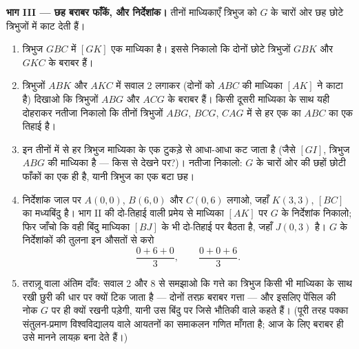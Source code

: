 \begin{problem}[{सप्ताहांत समस्या --- किसी त्रिभुज की माध्यिकाएँ एक
ही बिंदु पर मिलती हैं, हर एक के दो-तिहाई पर}]
\medskip
\noindent\textbf{भाग III --- छह बराबर फाँकें, और निर्देशांक।}
तीनों माध्यिकाएँ त्रिभुज को $G$ के चारों ओर छह छोटे त्रिभुजों में
काट देती हैं।
\begin{enumerate}[resume]
  \item त्रिभुज $GBC$ में  $[GK]$ एक माध्यिका है। इससे
        निकालो कि दोनों छोटे त्रिभुजों $GBK$ और $GKC$ के 
        बराबर हैं।
  \item त्रिभुजों $ABK$ और $AKC$ में सवाल 2 लगाकर (दोनों को $ABC$
        की माध्यिका $[AK]$ ने काटा है) दिखाओ कि त्रिभुजों $ABG$
        और $ACG$ के  बराबर हैं। किसी दूसरी माध्यिका के
        साथ यही दोहराकर नतीजा निकालो कि तीनों त्रिभुजों $ABG$,
        $BCG$, $CAG$ में से हर एक का  $ABC$ का एक तिहाई
        है।
  \item इन तीनों में से हर त्रिभुज माध्यिका के एक टुकड़े से आधा-आधा
        कट जाता है (जैसे $[GI]$, त्रिभुज $ABG$ की माध्यिका है ---
        किस  से देखने पर?)। नतीजा निकालो: $G$ के चारों ओर की
        छहों छोटी फाँकों का  एक ही है, यानी त्रिभुज का एक
        बटा छह।
  \item निर्देशांक जाल पर $A(0, 0)$, $B(6, 0)$ और $C(0, 6)$ लगाओ,
        जहाँ $K(3, 3)$, $[BC]$ का मध्यबिंदु है। भाग II की
        दो-तिहाई वाली प्रमेय से माध्यिका $[AK]$ पर $G$ के
        निर्देशांक निकालो; फिर जाँचो कि वही बिंदु माध्यिका $[BJ]$
        के भी दो-तिहाई पर बैठता है, जहाँ $J(0, 3)$ है। $G$ के
        निर्देशांकों की तुलना इन औसतों से करो
        \[
        \frac{0 + 6 + 0}{3},
        \qquad
        \frac{0 + 0 + 6}{3} .
        \]
  \item तराज़ू वाला अंतिम दाँव: सवाल 2 और 8 से समझाओ कि गत्ते का
        त्रिभुज किसी भी माध्यिका के साथ रखी छुरी की धार पर क्यों
        टिक जाता है --- दोनों तरफ़ बराबर गत्ता --- और इसलिए पेंसिल
        की नोक $G$ पर ही क्यों रखनी पड़ेगी, यानी उस बिंदु पर जिसे
        भौतिकी वाले  कहते हैं। (पूरी तरह पक्का
        संतुलन-प्रमाण विश्वविद्यालय वाले आयतनों का समाकलन गणित
        माँगता है; आज के लिए बराबर  ही उसे मानने लायक़ बना
        देते हैं।)
\end{enumerate}
\end{problem}
